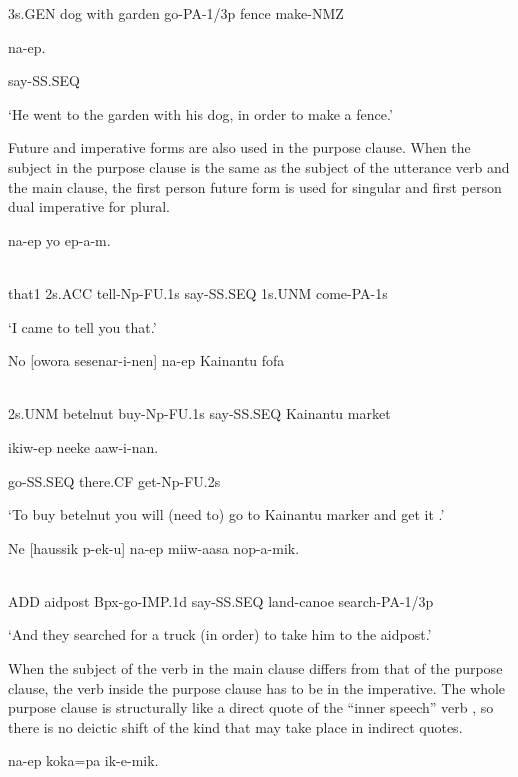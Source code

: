 3s.GEN  dog  with  garden  go-PA-1/3p  fence  make-NMZ

na-ep.

say-SS.SEQ

`He went to the garden with his dog, in order to make a fence.'

Future and imperative forms are also used in the purpose clause. When the subject in the purpose clause is the same as the subject of the utterance verb and the main clause, the first person future form is used for singular and first person dual imperative for plural.

\ea%
\label{ex:x1614}
  na-ep  yo  ep-a-m. \\
      \\
\glt
\z

that1  2s.ACC  tell-Np-FU.1s  say-SS.SEQ  1s.UNM  come-PA-1s

`I came to tell you that.'

\ea%
\label{ex:x1616}
\gll No  [owora  sesenar-i-nen]  na-ep  Kainantu  fofa \\
      \\
\glt
\z

2s.UNM  betelnut  buy-Np-FU.1s  say-SS.SEQ  Kainantu  market

ikiw-ep  neeke  aaw-i-nan.

go-SS.SEQ  there.CF  get-Np-FU.2s

`To buy betelnut you will (need to) go to Kainantu marker and get it .'

\ea%
\label{ex:x1620}
\gll Ne  [haussik  p-ek-u]  na-ep  miiw-aasa  nop-a-mik. \\
      \\
\glt
\z

ADD  aidpost  Bpx-go-IMP.1d  say-SS.SEQ  land-canoe  search-PA-1/3p

`And they searched for a truck (in order) to take him to the aidpost.'

When the subject of the verb in the main clause differs from that of the purpose clause, the verb inside the purpose clause has to be in the imperative. The whole purpose clause is structurally like a direct quote of the ``inner speech'' verb , so there is no deictic shift of the kind that may take place in indirect quotes.  

\ea%
\label{ex:x1062}
\gll [Me  yiar-uk]  na-ep  koka=pa  ik-e-mik. \\
      \\
\glt
\z

